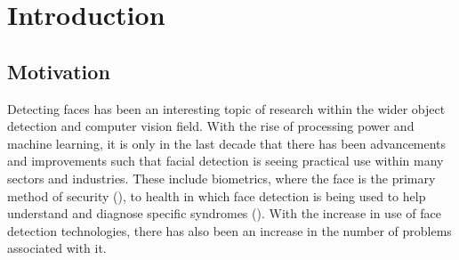 \documentclass{l4proj}
\begin{document}
\tableofcontents

%
%
%
%
%
%
%
%
\chapter{Introduction}
\label{introduction}

\section{Motivation}
\label{motivation}


Detecting faces has been an interesting topic of research within the wider object detection and computer vision field. With the rise of processing power and machine learning, it is only in the last decade that there has been advancements and improvements such that facial detection is seeing practical use within many sectors and industries. These include biometrics, where the face is the primary method of security (\cite{facebio}), to health in which face detection is being used to help understand and diagnose specific syndromes (\cite{facehealth}). With the increase in use of face detection technologies, there has also been an increase in the number of problems associated with it.
\end{document}
